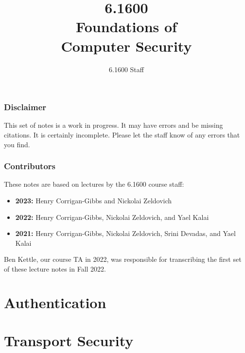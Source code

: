 \documentclass[
letterpaper, %
oneside,
nobib
]{tufte-book}
\author{6.1600 Staff}
\title{6.1600\\Foundations of\\Computer Security}
\begin{document}
\mainmatter

\maketitle

\section{Disclaimer}
This set of notes is a work in progress. It may have errors and be missing citations. It is certainly incomplete. Please let the staff know of any errors that you find.

\section{Contributors}
These notes are based on lectures by the 6.1600 course staff:
\begin{itemize}
  \item \textbf{2023:} Henry Corrigan-Gibbs and Nickolai Zeldovich
  \item \textbf{2022:} Henry Corrigan-Gibbs, Nickolai Zeldovich, and Yael Kalai
  \item \textbf{2021:} Henry Corrigan-Gibbs, Nickolai Zeldovich, Srini Devadas, and Yael Kalai
\end{itemize}
Ben Kettle, our course TA in 2022, was responsible for transcribing
the first set of these lecture notes in Fall 2022.

\clearpage

\tableofcontents*
\clearpage





\part{Authentication}








\part{Transport Security}





 

\end{document}
